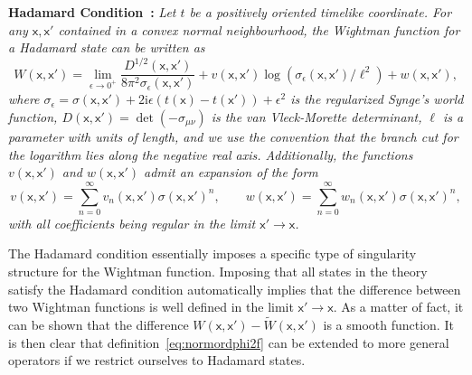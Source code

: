 \documentclass[letterpaper,12pt,titlepage,oneside,final]{book}
\newcommand{\mf}{\mathsf}%
\newcommand{\ii}{\mathrm{i}}
\begin{document}
\noindent\textbf{Hadamard Condition~\cite{kayWald}:} \textit{Let $t$ be a positively oriented timelike coordinate. For any $\mf x, \mf x'$ contained in a convex normal neighbourhood, the Wightman function for a Hadamard state can be written as}
\begin{equation}\label{eq:Hadamard}
    W(\mf x, \mf x') = \lim_{\epsilon \to 0^+}\frac{D^{1/2}(\mf x, \mf x')}{8 \pi^2 \sigma_{\epsilon}(\mf x, \mf x')} + v(\mf x, \mf x') \log(\sigma_\epsilon(\mf x, \mf x')/\ell^2) + w(\mf x, \mf x'),
\end{equation}
\textit{where $\sigma_\epsilon=  \sigma(\mf x, \mf x') +2 \ii \epsilon(t(\mf x) - t(\mf x')) + \epsilon^2$ is the regularized Synge's world function, $D(\mf x, \mf x') = \det(- \sigma_{\mu\nu})$ is the van Vleck-Morette determinant, $\ell$ is a parameter with units of length, and we use the convention that the branch cut for the logarithm lies along the negative real axis. Additionally, the functions $v(\mf x, \mf x')$ and $w(\mf x, \mf x')$ admit an expansion of the form}
\begin{equation}\label{eq:regvw}
    v(\mf x, \mf x') = \sum_{n=0}^\infty v_n(\mf x, \mf x') \sigma(\mf x, \mf x')^n, \quad\quad w(\mf x, \mf x') = \sum_{n=0}^\infty w_n(\mf x, \mf x') \sigma(\mf x, \mf x')^n,
\end{equation}
\textit{with all coefficients being regular in the limit $\mf x' \to \mf x$.}

\noindent The Hadamard condition essentially imposes a specific type of singularity structure for the Wightman function. Imposing that all states in the theory satisfy the Hadamard condition automatically implies that the difference between two Wightman functions is well defined in the limit $\mf x' \to \mf x$. As a matter of fact, it can be shown that the difference $W(\mf x, \mf x') - \tilde{W}(\mf x,\mf x')$ is a smooth function. It is then clear that definition~\eqref{eq:normordphi2f} can be extended to more general operators if we restrict ourselves to Hadamard states.
\end{document}

